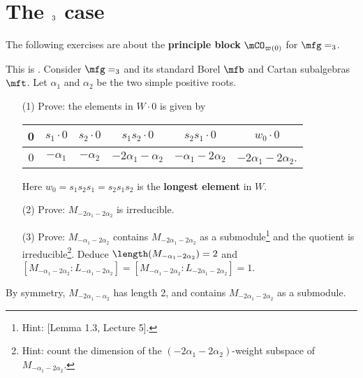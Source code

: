 \section{The \texorpdfstring{$\sl_3$}{sl3} case}

	The following exercises are about the \textbf{principle block} $\mCO_{\varpi(0)}$ for $\mfg=\sl_3$.

	\begin{exe}
		\label{exe-H3P2}
		This is . Consider $\mfg = \sl_3$ and its standard Borel $\mfb$ and Cartan subalgebras $\mft$. Let $\alpha_1$ and $\alpha_2$ be the two simple positive roots.
		\begin{itemize}
			\item[(1)]
				Prove: the elements in $W\cdot 0$ is given by
				\begin{center}
					\begin{tabular}{|c |c| c| c| c| c|}
					\hline 
					0 & $s_1\cdot 0$ & $s_2\cdot 0$ & $s_1s_2 \cdot 0$ & $s_2 s_1 \cdot 0$ & $w_0 \cdot 0$ \\
				\hline
						0 & $-\alpha_1$ & $-\alpha_2$ & $-2\alpha_1-\alpha_2$ & $-\alpha_1-2\alpha_2$ & $-2\alpha_1-2\alpha_2$. \\
			\hline
				\end{tabular}
			\end{center}
			Here $w_0 = s_1 s_2 s_1 = s_2 s_1 s_2$ is the \textbf{longest element} in $W$.
			\item[(2)]
				Prove: $M_{-2\alpha_1-2\alpha_2}$ is irreducible.
			\item[(3)]
				Prove: $M_{-\alpha_1-2\alpha_2}$ contains $M_{-2\alpha_1-2\alpha_2}$ as a submodule\footnote{Hint: [Lemma 1.3, Lecture 5].} and the quotient is irreducible\footnote{Hint: count the dimension of the $(-2\alpha_1-2\alpha_2)$-weight subspace of $M_{-\alpha_1-2\alpha_2}$.}. Deduce $\length(M_{-\alpha_1-2\alpha_2})=2$ and $[M_{-\alpha_1-2\alpha_2}: L_{-\alpha_1-2\alpha_2}] = [M_{-\alpha_1-2\alpha_2}: L_{-2\alpha_1-2\alpha_2}] = 1$.
		\end{itemize}
	\end{exe}

	\begin{rem}
		By symmetry, $M_{-2\alpha_1-\alpha_2}$ has length 2, and contains $M_{-2\alpha_1-2\alpha_2}$ as a submodule.
	\end{rem}

